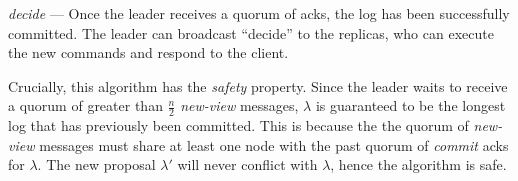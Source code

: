 \textit{decide} --- Once the leader receives a quorum of acks, the log has been successfully committed. The leader can broadcast ``decide'' to the replicas, who can execute the new commands and respond to the client.

Crucially, this algorithm has the \textit{safety} property. Since the leader waits to receive a quorum of greater than $\frac{n}{2}$ \textit{new-view} messages, $\lambda$ is guaranteed to be the longest log that has previously been committed. This is because the the quorum of \textit{new-view} messages must share at least one node with the past quorum of \textit{commit} acks for $\lambda$. The new proposal $\lambda'$ will never conflict with $\lambda$, hence the algorithm is safe.

